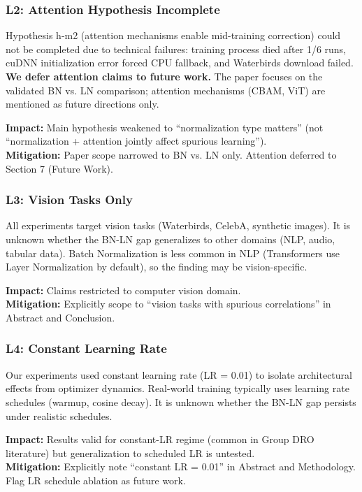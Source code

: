 \subsubsection{L2: Attention Hypothesis Incomplete}

Hypothesis h-m2 (attention mechanisms enable mid-training correction) could not be completed due to technical failures: training process died after 1/6 runs, cuDNN initialization error forced CPU fallback, and Waterbirds download failed. \textbf{We defer attention claims to future work.} The paper focuses on the validated BN vs. LN comparison; attention mechanisms (CBAM, ViT) are mentioned as future directions only.

\textbf{Impact:} Main hypothesis weakened to ``normalization type matters'' (not ``normalization + attention jointly affect spurious learning''). \\
\textbf{Mitigation:} Paper scope narrowed to BN vs. LN only. Attention deferred to Section 7 (Future Work).

\subsubsection{L3: Vision Tasks Only}

All experiments target vision tasks (Waterbirds, CelebA, synthetic images). It is unknown whether the BN-LN gap generalizes to other domains (NLP, audio, tabular data). Batch Normalization is less common in NLP (Transformers use Layer Normalization by default), so the finding may be vision-specific.

\textbf{Impact:} Claims restricted to computer vision domain. \\
\textbf{Mitigation:} Explicitly scope to ``vision tasks with spurious correlations'' in Abstract and Conclusion.

\subsubsection{L4: Constant Learning Rate}

Our experiments used constant learning rate (LR = 0.01) to isolate architectural effects from optimizer dynamics. Real-world training typically uses learning rate schedules (warmup, cosine decay). It is unknown whether the BN-LN gap persists under realistic schedules.

\textbf{Impact:} Results valid for constant-LR regime (common in Group DRO literature) but generalization to scheduled LR is untested. \\
\textbf{Mitigation:} Explicitly note ``constant LR = 0.01'' in Abstract and Methodology. Flag LR schedule ablation as future work.


